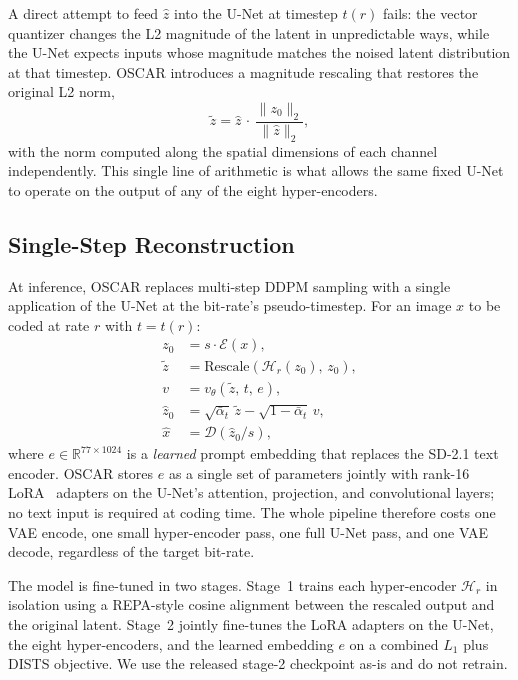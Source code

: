\documentclass[conference]{IEEEtran}
\begin{document}
A direct attempt to feed $\hat{z}$ into the U-Net at timestep $t(r)$ fails: the
vector quantizer changes the L2 magnitude of the latent in unpredictable ways,
while the U-Net expects inputs whose magnitude matches the noised latent
distribution at that timestep. OSCAR introduces a magnitude rescaling that
restores the original L2 norm,
\begin{equation}
\tilde{z} = \hat{z} \,\cdot\, \frac{\lVert z_0 \rVert_2}{\lVert \hat{z} \rVert_2},
\label{eq:rescale}
\end{equation}
with the norm computed along the spatial dimensions of each channel
independently. This single line of arithmetic is what allows the same fixed
U-Net to operate on the output of any of the eight hyper-encoders.

\subsection{Single-Step Reconstruction}

At inference, OSCAR replaces multi-step DDPM sampling with a single application
of the U-Net at the bit-rate's pseudo-timestep. For an image $x$ to be coded at
rate $r$ with $t = t(r)$:
\begin{align*}
z_0       &= s \cdot \mathcal{E}(x), \\
\tilde{z} &= \text{Rescale}\!\left(\mathcal{H}_r(z_0),\, z_0\right), \\
v         &= v_\theta(\tilde{z},\, t,\, e), \\
\hat{z}_0 &= \sqrt{\bar{\alpha}_t}\, \tilde{z} - \sqrt{1-\bar{\alpha}_t}\, v, \\
\hat{x}   &= \mathcal{D}(\hat{z}_0 / s),
\end{align*}
where $e \in \mathbb{R}^{77 \times 1024}$ is a \emph{learned} prompt embedding
that replaces the SD-2.1 text encoder. OSCAR stores $e$ as a single set of
parameters jointly with rank-16 LoRA~\cite{lora} adapters on the U-Net's
attention, projection, and convolutional layers; no text input is required at
coding time. The whole pipeline therefore costs one VAE encode, one small
hyper-encoder pass, one full U-Net pass, and one VAE decode, regardless of the
target bit-rate.

The model is fine-tuned in two stages. Stage~1 trains each hyper-encoder
$\mathcal{H}_r$ in isolation using a REPA-style cosine alignment between the
rescaled output and the original latent. Stage~2 jointly fine-tunes the LoRA
adapters on the U-Net, the eight hyper-encoders, and the learned embedding $e$
on a combined $L_1$ plus DISTS objective. We use the released stage-2
checkpoint as-is and do not retrain.
\end{document}
